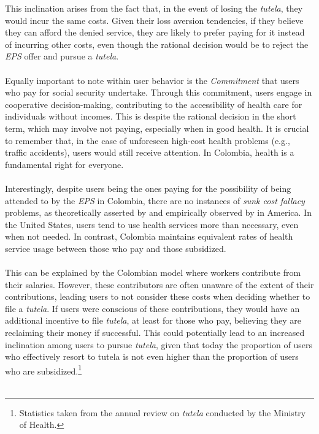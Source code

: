 \documentclass[12pt]{article}
\begin{document}
\begin{flushleft}
    This inclination arises from the fact that, in the event of losing the \textit{tutela}, they would incur the same costs. Given their loss aversion tendencies, if they believe they can afford the denied service, they are likely to prefer paying for it instead of incurring other costs, even though the rational decision would be to reject the \textit{EPS} offer and pursue a \textit{tutela}.\\~\\

    Equally important to note within user behavior is the \textit{Commitment} that users who pay for social security undertake. Through this commitment, users engage in cooperative decision-making, contributing to the accessibility of health care for individuals without incomes. This is despite the rational decision in the short term, which may involve not paying, especially when in good health. It is crucial to remember that, in the case of unforeseen high-cost health problems (e.g., traffic accidents), users would still receive attention. In Colombia, health is a fundamental right for everyone.\\~\\

    Interestingly, despite users being the ones paying for the possibility of being attended to by the \textit{EPS} in Colombia, there are no instances of \textit{sunk cost fallacy} problems, as theoretically asserted by \citet{arrow1963uncertainty} and empirically observed by \citet{braverman2012assessment} in America. In the United States, users tend to use health services more than necessary, even when not needed. In contrast, Colombia maintains equivalent rates of health service usage between those who pay and those subsidized.\\~\\

    This can be explained by the Colombian model where workers contribute from their salaries. However, these contributors are often unaware of the extent of their contributions, leading users to not consider these costs when deciding whether to file a \textit{tutela}. If users were conscious of these contributions, they would have an additional incentive to file \textit{tutela}, at least for those who pay, believing they are reclaiming their money if successful. This could potentially lead to an increased inclination among users to pursue \textit{tutela}, given that today the proportion of users who effectively resort to tutela is not even higher than the proportion of users who are subsidized.\footnote{Statistics taken from the annual review on \textit{tutela} conducted by the Ministry of Health.}\\~\\


\end{flushleft}
\end{document}
